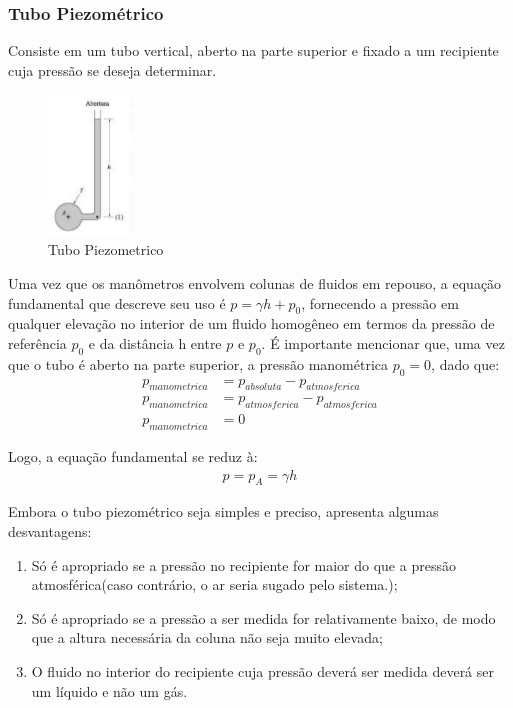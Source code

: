 \documentclass{article}
\begin{document}
\subsubsection{Tubo Piezométrico}
Consiste em um tubo vertical, aberto na parte superior e fixado a um recipiente cuja pressão se deseja determinar.

\begin{figure}[!h]
     \centering
     \includegraphics[width=0.2\textwidth]{tuboPiezometrico.jpg} 
     \caption{Tubo Piezometrico}
     \label{fig:tuboPiezometrico} 
     \hfill
\end{figure}

Uma vez que os manômetros envolvem colunas de fluidos em repouso, a equação fundamental que descreve seu uso é $p=\gamma h + p_0$, fornecendo a pressão em qualquer elevação no interior de um fluido homogêneo em termos da pressão de referência $p_0$ e da distância h entre $p$ e $p_0$. É importante mencionar que, uma vez que o tubo é aberto na parte superior, a pressão manométrica $p_0=0$, dado que:
\begin{align*}
p_{manometrica}&=p_{absoluta}-p_{atmosferica}\\
p_{manometrica}&=p_{atmosferica}-p_{atmosferica}\\
p_{manometrica}&=0
\end{align*}

Logo, a equação fundamental se reduz à:
\begin{align*}
     p = p_A = \gamma h 
\end{align*}

Embora o tubo piezométrico seja simples e preciso, apresenta algumas desvantagens:
\begin{enumerate}
     \item Só é apropriado se a pressão no recipiente for maior do que a pressão atmosférica(caso contrário, o ar seria sugado pelo sistema.);
     \item Só é apropriado se a pressão a ser medida for relativamente baixo, de modo que a altura necessária da coluna não seja muito elevada;
     \item O fluido no interior do recipiente cuja pressão deverá ser medida deverá ser um líquido e não um gás.
\end{enumerate}
\end{document}
